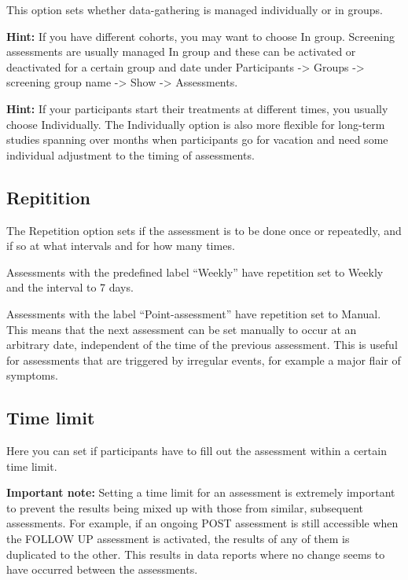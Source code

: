 \documentclass[]{book}
\begin{document}
This option sets whether data-gathering is managed individually or in groups.

\textbf{Hint:} If you have different cohorts, you may want to choose In group. Screening assessments are usually managed In group and these can be activated or deactivated for a certain group and date under Participants -\textgreater{} Groups -\textgreater{} screening group name -\textgreater{} Show -\textgreater{} Assessments.

\textbf{Hint:} If your participants start their treatments at different times, you usually choose Individually. The Individually option is also more flexible for long-term studies spanning over months when participants go for vacation and need some individual adjustment to the timing of assessments.

\hypertarget{repitition}{%
\subsection{Repitition}\label{repitition}}

The Repetition option sets if the assessment is to be done once or repeatedly, and if so at what intervals and for how many times.

Assessments with the predefined label ``Weekly'' have repetition set to Weekly and the interval to 7 days.

Assessments with the label ``Point-assessment'' have repetition set to Manual. This means that the next assessment can be set manually to occur at an arbitrary date, independent of the time of the previous assessment. This is useful for assessments that are triggered by irregular events, for example a major flair of symptoms.

\hypertarget{time-limit}{%
\subsection{Time limit}\label{time-limit}}

Here you can set if participants have to fill out the assessment within a certain time limit.

\textbf{Important note:} Setting a time limit for an assessment is extremely important to prevent the results being mixed up with those from similar, subsequent assessments. For example, if an ongoing POST assessment is still accessible when the FOLLOW UP assessment is activated, the results of any of them is duplicated to the other. This results in data reports where no change seems to have occurred between the assessments.
\end{document}
